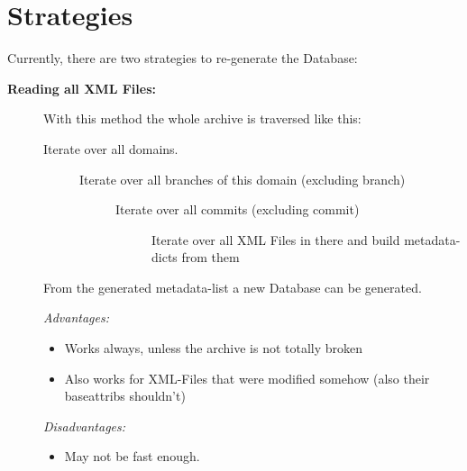 \documentclass[letterpaper,10pt,english]{sphinxmanual}
\begin{document}
\section{Strategies}
\label{recover:strategies}
Currently, there are two strategies to re-generate the Database:
\begin{description}
\item[{\textbf{Reading all XML Files:}}] \leavevmode
With this method the whole archive is traversed like this:
\begin{description}
\item[{Iterate over all domains.}] \leavevmode\begin{description}
\item[{Iterate over all branches of this domain (excluding  branch)}] \leavevmode\begin{description}
\item[{Iterate over all commits (excluding  commit)}] \leavevmode
Iterate over all XML Files in there and build metadata-dicts from them

\end{description}

\end{description}

\end{description}

From the generated metadata-list a new Database can be generated.

\emph{Advantages:}
\begin{itemize}
\item {} 
Works always, unless the archive is not totally broken

\item {} 
Also works for XML-Files that were modified somehow (also their baseattribs shouldn't)

\end{itemize}

\emph{Disadvantages:}
\begin{itemize}
\item {} 
May not be fast enough.

\end{itemize}

\end{description}
\end{document}
